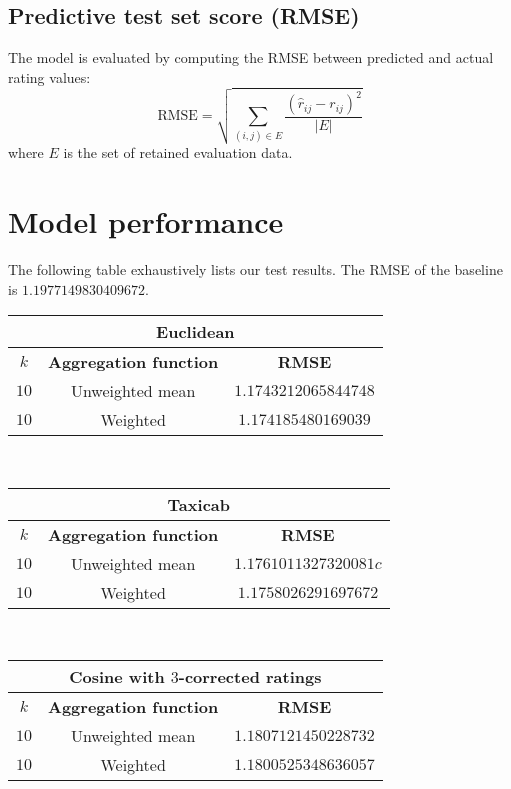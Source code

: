 \documentclass[final]{cvpr}
\begin{document}
\subsection{Predictive test set score (RMSE)}
The model is evaluated by computing the RMSE between predicted and actual rating values:
$$ \text{RMSE} = \sqrt{\sum_{(i, j) \in E} \frac{{(\hat r_{ij} - r_{ij})}^2}{\left| E \right|}} $$
where $E$ is the set of retained evaluation data.

\section{Model performance}
The following table exhaustively lists our test results.
The RMSE of the baseline is $1.1977149830409672$.

\vspace{1em}

\begin{tabular}{| c | c | c |}
	\hline
	\multicolumn{3}{|c|}{\textbf{Euclidean}}\\
	\hline
	$k$ & \textbf{Aggregation function} & \textbf{RMSE}\\
	\hline
	$10$ & Unweighted mean & $1.1743212065844748$\\
	\hline
	$10$ & Weighted & $1.174185480169039$\\
	\hline
\end{tabular}\\

\vspace{1em}

\begin{tabular}{| c | c | c |}
	\hline
	\multicolumn{3}{|c|}{\textbf{Taxicab}}\\
	\hline
	$k$ & \textbf{Aggregation function} & \textbf{RMSE}\\
	\hline
	$10$ & Unweighted mean & $1.1761011327320081c$\\
	\hline
	$10$ & Weighted & $1.1758026291697672$\\
	\hline
\end{tabular}\\

\vspace{1em}

\begin{tabular}{| c | c | c |}
	\hline
	\multicolumn{3}{|c|}{\textbf{Cosine with $3$-corrected ratings}}\\
	\hline
	$k$ & \textbf{Aggregation function} & \textbf{RMSE}\\
	\hline
	$10$ & Unweighted mean & $1.1807121450228732$\\
	\hline
	$10$ & Weighted & $1.1800525348636057$\\
	\hline
\end{tabular}\\
\end{document}
